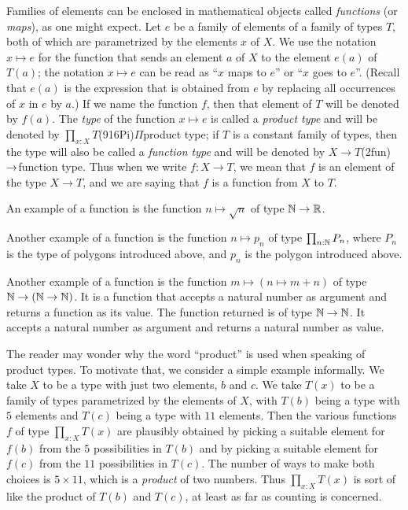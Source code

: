 Families of elements can be enclosed in mathematical objects called \emph{functions} (or \emph{maps}), as one might
expect.
Let $e$ be a family of elements of a family of types $T$,
both of which are parametrized by the elements $x$ of $X$.  We use the notation $x \mapsto e$ for the function that sends an element $a$ of $X$
to the element $e(a)$ of $T(a)$; the notation $x \mapsto e$ can be read as ``$x$ maps to $e$'' or ``$x$ goes to $e$''.  (Recall that $e(a)$ is
the expression that is obtained from $e$ by replacing all occurrences of $x$ in $e$ by $a$.)  If we name the function $f$, then that element of
$T$ will be denoted by $f(a)$.  The \emph{type} of the function $x \mapsto e$ is called a \emph{product type} and will be denoted by
$\prod_{x:X} T$\glossary(916Pi){$\Pi$}{product type}; if $T$ is a constant family of types, then the type will also be
called a \emph{function type} and will be denoted by $X \to T$\glossary(2fun){$\protect\to$}{function type}.  Thus when we write $f : X \to T$,
we mean that $f$ is an element of the type $X \to T$, and we are saying that $f$ is a function from $X$ to $T$.

An example of a function is the function $n \mapsto \sqrt n$ of type $\mathbb{N} \to \mathbb{R}$.

Another example of a function is the function $n \mapsto p_n$ of type $\prod_{n:\mathbb{N}} P_n$, where $P_n$ is the type of polygons introduced above,
and $p_n$ is the polygon introduced above.

Another example of a function is the function $m \mapsto (n \mapsto m+n)$ of type $\mathbb{N} \to (\mathbb{N} \to \mathbb{N})$.  It is a function that accepts a
natural number as argument and returns a function as its value.  The function returned is of type $\mathbb{N} \to \mathbb{N}$.  It accepts a natural number
as argument and returns a natural number as value.

The reader may wonder why the word ``product'' is used when speaking of product types.  To motivate that, we consider a simple example
informally.  We take $X$ to be a type with just two elements, $b$ and $c$.  We take $T(x)$ to be a family of types parametrized by the elements
of $X$, with $T(b)$ being a type with $5$ elements and $T(c)$ being a type with $11$ elements.  Then the various functions $f$ of type
$\prod_{x:X} T(x)$ are plausibly obtained by picking a suitable element for $f(b)$ from the $5$ possibilities in $T(b)$ and by picking a
suitable element for $f(c)$ from the $11$ possibilities in $T(c)$.  The number of ways to make both choices is $5 \times 11$, which is a
\emph{product} of two numbers.  Thus $\prod_{x:X} T(x)$ is sort of like the product of $T(b)$ and $T(c)$, at least as far as counting is
concerned.

